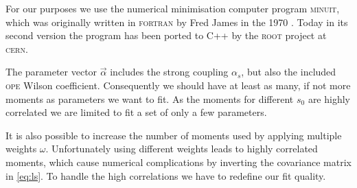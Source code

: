 \documentclass[../../index.tex]{subfiles}
\begin{document}
For our purposes we use the numerical minimisation computer program
\textsc{minuit}, which was originally written in \textsc{fortran} by Fred James
in the 1970 \cite{James1975}. Today in its second version the program has been
ported to C++ by the \textsc{root} \cite{Brun1997} project at \textsc{cern}.

The parameter vector \(\vec\alpha\) includes the strong coupling \(\alpha_s\),
but also the included \textsc{ope} Wilson coefficient. Consequently we should
have at least as many, if not more moments as parameters we want to fit. As the
moments for different \(s_0\) are highly correlated we are limited to fit a set
of only a few parameters.

It is also possible to increase the number of moments used by applying multiple
weights \(\omega\). Unfortunately using different weights leads to highly
correlated moments, which cause numerical complications by inverting the
covariance matrix in \cref{eq:ls}. To handle the high correlations we have to
redefine our fit quality.
\end{document}
